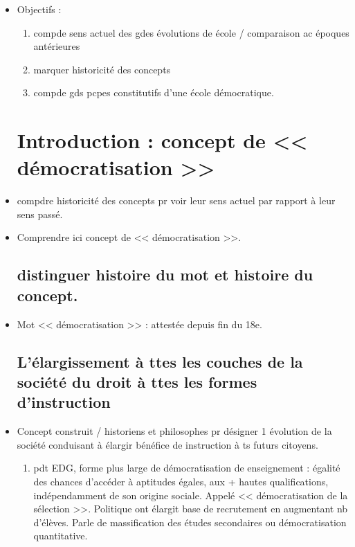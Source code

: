 \documentclass[12pt]{report}
\begin{document}
\begin{itemize}
\item Objectifs : 
\begin{enumerate}
\item compde sens actuel des gdes évolutions de école / comparaison ac époques antérieures \\
\item marquer historicité des concepts \\
\item compde gds pcpes constitutifs d'une école démocratique.\\
\end{enumerate}


\section*{Introduction : concept de << démocratisation >>}

\item compdre historicité des concepts pr voir leur sens actuel par rapport à leur sens passé. \\
\item Comprendre ici concept de << démocratisation >>. \\

\subsection*{distinguer histoire du mot et histoire du concept.}

\item Mot << démocratisation >> : attestée depuis fin du 18e. \\

\subsection*{L'élargissement à ttes les couches de la société du droit à ttes les formes d'instruction}

\item Concept construit / historiens et philosophes pr désigner 1 évolution de la société conduisant à élargir bénéfice de instruction à ts futurs citoyens.
\begin{enumerate}
\item pdt EDG, forme plus large de démocratisation de enseignement : égalité des chances d'accéder à aptitudes égales, aux + hautes qualifications, indépendamment de son origine sociale. Appelé << démocratisation de la sélection >>. Politique ont élargit base de recrutement en augmentant nb d'élèves. Parle de massification des études secondaires ou démocratisation quantitative. \\


\end{enumerate}
\end{itemize}
\end{document}
